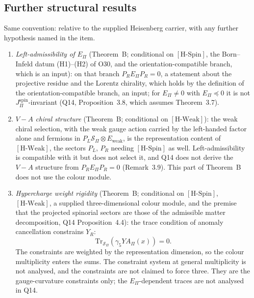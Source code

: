 \documentclass[11pt,a4paper]{article}
\theoremstyle{definition}
\newcommand{\Sbundle}{\mathcal{S}_\Pi}
\newcommand{\Epi}{E_\Pi}
\newcommand{\Ew}{E_{\mathrm{weak}}}
\newcommand{\HSpin}{\ensuremath{[\mathrm{H\text{-}Spin}]}}
\newcommand{\HWeak}{\ensuremath{[\mathrm{H\text{-}Weak}]}}
\newcommand{\JBI}{{J^{\mathrm{spin}}_\Pi}}
\begin{document}
    \subsection{Further structural results}
      \label{sec:further-structural}

      Same convention: relative to the supplied Heisenberg carrier, with any further hypothesis
      named in the item.

      \begin{enumerate}
        \item \textit{Left-admissibility of $\Epi$} (Theorem~B; conditional on \HSpin{}, the Born--Infeld datum
        (H1)--(H2) of O30, and the orientation-compatible branch, which is an input):
        on that branch $P_R \Epi P_R = 0$, a statement about the projective residue and the Lorentz chirality, which
        holds by the definition of the orientation-compatible branch, an input; for $\Epi\neq0$ with $\Epi\preceq0$ it
        is not $\JBI$-invariant (Q14, Proposition~3.8, which assumes Theorem~3.7).

        \item \textit{$V-A$ chiral structure} (Theorem~B; conditional on \HWeak{}):
        the weak chiral selection, with the weak gauge action carried by the left-handed factor alone and
        fermions in $P_L \Sbundle \otimes \Ew$, is the representation content of \HWeak{}, the sectors $P_L$,
        $P_R$ needing \HSpin{} as well.
        Left-admissibility is compatible with it but does not select it, and Q14 does not derive the $V-A$ structure
        from $P_R \Epi P_R = 0$ (Remark~3.9).
        This part of Theorem~B does not use the colour module.

        \item \textit{Hypercharge weight rigidity} (Theorem~B; conditional on \HSpin{}, \HWeak{}, a supplied
        three-dimensional colour module, and the premise that the projected spinorial sectors are those of the
        admissible matter decomposition, Q14 Proposition~4.4):
        the trace condition of anomaly cancellation constrains $Y_R$:
        \[
          \mathrm{Tr}_{\Sbundle}(\gamma_5 Y A_\Pi(x)) = 0.
        \]
        The constraints are weighted by the representation dimension, so the colour multiplicity
        enters the sums.
        The constraint system at general multiplicity is not analysed, and the constraints are not
        claimed to force three.
        They are the gauge-curvature constraints only; the $\Epi$-dependent traces are not analysed in Q14.


\end{enumerate}
\end{document}
